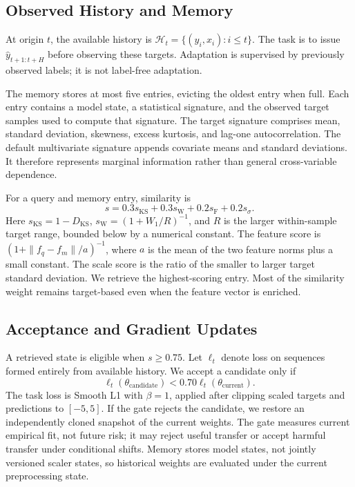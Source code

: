 \documentclass[conference]{IEEEtran}
\begin{document}
\subsection{Observed History and Memory}
At origin $t$, the available history is $\mathcal H_t=\{(y_i,x_i):i\leq t\}$. The task is to issue $\hat y_{t+1:t+H}$ before observing these targets. Adaptation is supervised by previously observed labels; it is not label-free adaptation.

The memory stores at most five entries, evicting the oldest entry when full. Each entry contains a model state, a statistical signature, and the observed target samples used to compute that signature. The target signature comprises mean, standard deviation, skewness, excess kurtosis, and lag-one autocorrelation. The default multivariate signature appends covariate means and standard deviations. It therefore represents marginal information rather than general cross-variable dependence.

For a query and memory entry, similarity is
\begin{equation}
 s=0.3s_{\mathrm{KS}}+0.3s_{\mathrm{W}}+0.2s_{\mathrm{F}}+0.2s_{\sigma}.
\end{equation}
Here $s_{\mathrm{KS}}=1-D_{\mathrm{KS}}$, $s_{\mathrm{W}}=(1+W_1/R)^{-1}$, and $R$ is the larger within-sample target range, bounded below by a numerical constant. The feature score is $(1+\|f_q-f_m\|/a)^{-1}$, where $a$ is the mean of the two feature norms plus a small constant. The scale score is the ratio of the smaller to larger target standard deviation. We retrieve the highest-scoring entry. Most of the similarity weight remains target-based even when the feature vector is enriched.

\subsection{Acceptance and Gradient Updates}
A retrieved state is eligible when $s\geq0.75$. Let $\ell_t$ denote loss on sequences formed entirely from available history. We accept a candidate only if
\begin{equation}
 \ell_t(\theta_{\mathrm{candidate}})<0.70\ell_t(\theta_{\mathrm{current}}).
\end{equation}
The task loss is Smooth L1 with $\beta=1$, applied after clipping scaled targets and predictions to $[-5,5]$. If the gate rejects the candidate, we restore an independently cloned snapshot of the current weights. The gate measures current empirical fit, not future risk; it may reject useful transfer or accept harmful transfer under conditional shifts. Memory stores model states, not jointly versioned scaler states, so historical weights are evaluated under the current preprocessing state.
\end{document}
